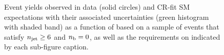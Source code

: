 \begin{figure}[h!]
\begin{center}
    \caption{Event yields observed in data (solid circles) and CR-fit SM expectations with their associated uncertainties (green histogram with shaded band) as a function of \HTmiss based on a sample of events that satisfy $n_{\text{jet}} \geq 6$ and $n_{\text{b}} = 0$, as well as the requirements on \scalht indicated by each sub-figure caption. }
    \label{fig:mhtdim_ge6j_eq0b}
  \end{center}
\end{figure}

